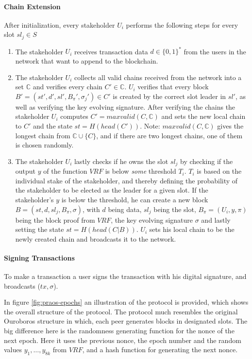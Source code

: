 \paragraph{Chain Extension} After initialization, every stakeholder $U_i$ performs the following steps for every slot $sl_j \in S$
\begin{enumerate}
    \item The stakeholder $U_i$ receives transaction data $d \in \{0,1\}^*$ from the users in the network that want to append to the blockchain.
    
    \item The stakeholder $U_i$ collects all valid chains received from the network into a set $\mathbb{C}$ and verifies every chain $C' \in \mathbb{C}$. $U_i$ verifies that every block $B'=(st',d',sl',B_{\pi}',\sigma_j') \in C'$ is created by the correct slot leader in $sl'$, as well as verifying the key evolving signature. After verifying the chains the stakeholder $U_i$ computes $C' = maxvalid(C, \mathbb{C})$ and sets the new local chain to $C'$ and the state $st = H(head(C'))$. Note: $maxvalid(C, \mathbb{C})$ gives the longest chain from $\mathbb{C} \cup \{C\}$, and if there are two longest chains, one of them is chosen randomly.
    
    \item The stakeholder $U_i$ lastly checks if he owns the slot $sl_j$ by checking if the output $y$ of the function $VRF$ is below \emph{some} threshold $T_i$. $T_i$ is based on the individual stake of the stakeholder, and thereby defining the probability of the stakeholder to be elected as the leader for a given slot. If the stakeholder's $y$ is below the threshold, he can create a new block $B = (st, d, sl_j, B_{\pi}, \sigma)$, with $d$ being data, $sl_j$ being the slot, $B_{\pi} = (U_i, y, \pi)$ being the block proof from $VRF$, the key evolving signature $\sigma$ and lastly setting the state $st = H(head(C|B))$. $U_i$ sets his local chain to be the newly created chain and broadcasts it to the network.
\end{enumerate}

\paragraph{Signing Transactions} To make a transaction a user signs the transaction with his digital signature, and broadcasts ($tx, \sigma$).

In figure \ref{fig:praos-epochs} an illustration of the protocol is provided, which shows the overall structure of the protocol. The protocol much resembles the original Ouroboros structure in which, each peer generates blocks in designated slots. The big difference here is the randomness generating function for the nonce of the next epoch. Here it uses the previous nonce, the epoch number and the random values $y_1, \dots, y_{8k}$ from $VRF$, and a hash function for generating the next nonce.

